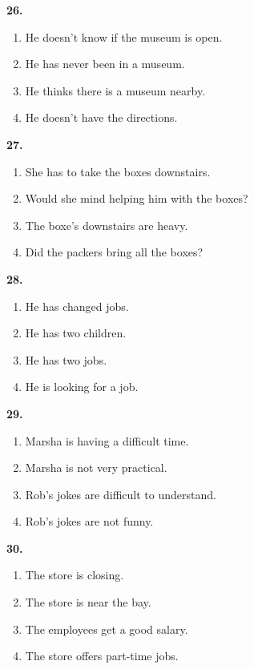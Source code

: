 \documentclass[12pt]{article}
\begin{document}
\par
\vspace{0.25\baselineskip}
\noindent\textbf{26.}
\begin{enumerate}[label=(\Alph*),leftmargin=*,itemsep=0.2em]
\item He doesn't know if the museum is open.
\item He has never been in a museum.
\item He thinks there is a museum nearby.
\item He doesn't have the directions.
\end{enumerate}
\par
\vspace{0.25\baselineskip}
\noindent\textbf{27.}
\begin{enumerate}[label=(\Alph*),leftmargin=*,itemsep=0.2em]
\item She has to take the boxes downstairs.
\item Would she mind helping him with the boxes?
\item The boxe's downstairs are heavy.
\item Did the packers bring all the boxes?
\end{enumerate}
\par
\vspace{0.25\baselineskip}
\noindent\textbf{28.}
\begin{enumerate}[label=(\Alph*),leftmargin=*,itemsep=0.2em]
\item He has changed jobs.
\item He has two children.
\item He has two jobs.
\item He is looking for a job.
\end{enumerate}
\par
\vspace{0.25\baselineskip}
\noindent\textbf{29.}
\begin{enumerate}[label=(\Alph*),leftmargin=*,itemsep=0.2em]
\item Marsha is having a difficult time.
\item Marsha is not very practical.
\item Rob's jokes are difficult to understand.
\item Rob's jokes are not funny.
\end{enumerate}
\par
\vspace{0.25\baselineskip}
\noindent\textbf{30.}
\begin{enumerate}[label=(\Alph*),leftmargin=*,itemsep=0.2em]
\item The store is closing.
\item The store is near the bay.
\item The employees get a good salary.
\item The store offers part-time jobs.
\end{enumerate}
\par
\vspace{0.25\baselineskip}
\end{document}
